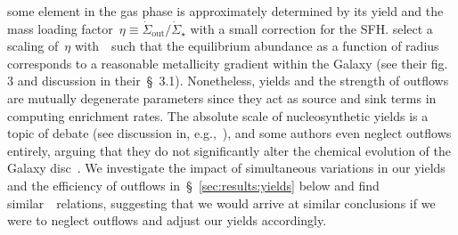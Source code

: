 \documentclass[ms.tex]{subfiles}
\begin{document}
some element in the gas phase is approximately determined by its yield and the
mass loading factor~$\eta \equiv \dot{\Sigma}_\text{out} / \dot{\Sigma}_\star$
with a small correction for the SFH.
\citet{Johnson2021} select a scaling of~$\eta$ with~\rgal~such that the
equilibrium abundance as a function of radius corresponds to a reasonable
metallicity gradient within the Galaxy (see their fig. 3 and discussion in
their~\S~3.1).
Nonetheless, yields and the strength of outflows are mutually degenerate
parameters since they act as source and sink terms in computing enrichment
rates.
The absolute scale of nucleosynthetic yields is a topic of debate (see
discussion in, e.g.,~\citealp{Griffith2021}), and some authors even neglect
outflows entirely, arguing that they do not significantly alter the chemical
evolution of the Galaxy disc~\citep[e.g.][]{Spitoni2019, Spitoni2021}.
We investigate the impact of simultaneous variations in our yields and the
efficiency of outflows in~\S~\ref{sec:results:yields} below
{\color{red} and find similar~\ohno~relations, suggesting that we would arrive
at similar conclusions if we were to neglect outflows and adjust our yields
accordingly.}
\end{document}
